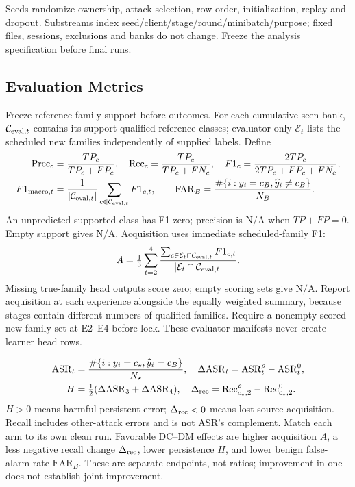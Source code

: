 \documentclass[10pt,a4paper]{article}
\newcommand{\NA}{\mathrm{N/A}}
\begin{document}
Seeds randomize ownership, attack selection, row order, initialization, replay and dropout. Substreams index seed/client/stage/round/minibatch/purpose; fixed files, sessions, exclusions and banks do not change. Freeze the analysis specification before final runs.

\subsection{Evaluation Metrics}
Freeze reference-family support before outcomes. For each cumulative seen bank, $\mathcal C_{{\rm eval},t}$ contains its support-qualified reference classes; evaluator-only $\mathcal E_t$ lists the scheduled new families independently of supplied labels. Define
\begin{equation}
\begin{aligned}
\mathrm{Prec}_c&=\frac{TP_c}{TP_c+FP_c},\quad\mathrm{Rec}_c=\frac{TP_c}{TP_c+FN_c},\quad
F1_c=\frac{2TP_c}{2TP_c+FP_c+FN_c},\\
F1_{{\rm macro},t}&=\frac1{|\mathcal C_{{\rm eval},t}|}\sum_{c\in\mathcal C_{{\rm eval},t}}F1_{c,t},\qquad
\mathrm{FAR}_B=\frac{\#\{i:y_i=c_B,\widehat y_i\ne c_B\}}{N_B}.
\end{aligned}
\label{eq:metrics}
\end{equation}
An unpredicted supported class has F1 zero; precision is $\NA$ when $TP+FP=0$. Empty support gives $\NA$. Acquisition uses immediate scheduled-family F1:
\begin{equation}
A=\tfrac13\sum_{t=2}^4\frac{\sum_{c\in\mathcal E_t\cap\mathcal C_{{\rm eval},t}}F1_{c,t}}{|\mathcal E_t\cap\mathcal C_{{\rm eval},t}|}.
\label{eq:acquisition}
\end{equation}
Missing true-family head outputs score zero; empty scoring sets give $\NA$. Report acquisition at each experience alongside the equally weighted summary, because stages contain different numbers of qualified families.
Require a nonempty scored new-family set at E2--E4 before lock. These evaluator manifests never create learner head rows.

\begin{equation}
\begin{aligned}
\mathrm{ASR}_t&=\frac{\#\{i:y_i=c_\star,\widehat y_i=c_B\}}{N_\star},\quad
\Delta\mathrm{ASR}_t=\mathrm{ASR}^{\rho}_t-\mathrm{ASR}^{0}_t,\\
H&=\tfrac12(\Delta\mathrm{ASR}_3+\Delta\mathrm{ASR}_4),\quad
\Delta_{\rm rec}=\mathrm{Rec}^{\rho}_{c_\star,2}-\mathrm{Rec}^{0}_{c_\star,2}.
\end{aligned}
\label{eq:asr}
\end{equation}
$H>0$ means harmful persistent error; $\Delta_{\rm rec}<0$ means lost source acquisition. Recall includes other-attack errors and is not ASR's complement. Match each arm to its own clean run. Favorable DC--DM effects are higher acquisition $A$, a less negative recall change $\Delta_{\rm rec}$, lower persistence $H$, and lower benign false-alarm rate $\mathrm{FAR}_B$. These are separate endpoints, not ratios; improvement in one does not establish joint improvement.
\end{document}
